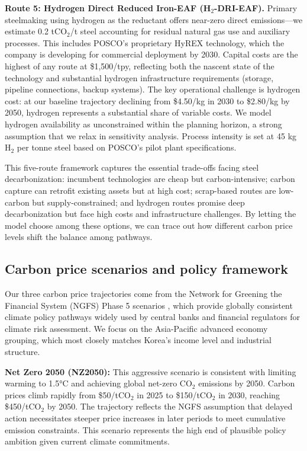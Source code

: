 \documentclass[preprint,1p,authoryear]{elsarticle}
\begin{document}
\textbf{Route 5: Hydrogen Direct Reduced Iron-EAF (H$_2$-DRI-EAF).} Primary steelmaking using hydrogen as the reductant offers near-zero direct emissions—we estimate 0.2 tCO$_2$/t steel accounting for residual natural gas use and auxiliary processes. This includes POSCO's proprietary HyREX technology, which the company is developing for commercial deployment by 2030. Capital costs are the highest of any route at \$1,500/tpy, reflecting both the nascent state of the technology and substantial hydrogen infrastructure requirements (storage, pipeline connections, backup systems). The key operational challenge is hydrogen cost: at our baseline trajectory declining from \$4.50/kg in 2030 to \$2.80/kg by 2050, hydrogen represents a substantial share of variable costs. We model hydrogen availability as unconstrained within the planning horizon, a strong assumption that we relax in sensitivity analysis. Process intensity is set at 45 kg H$_2$ per tonne steel based on POSCO's pilot plant specifications.

This five-route framework captures the essential trade-offs facing steel decarbonization: incumbent technologies are cheap but carbon-intensive; carbon capture can retrofit existing assets but at high cost; scrap-based routes are low-carbon but supply-constrained; and hydrogen routes promise deep decarbonization but face high costs and infrastructure challenges. By letting the model choose among these options, we can trace out how different carbon price levels shift the balance among pathways.

\subsection{Carbon price scenarios and policy framework}

Our three carbon price trajectories come from the Network for Greening the Financial System (NGFS) Phase 5 scenarios \citep{NGFS2024}, which provide globally consistent climate policy pathways widely used by central banks and financial regulators for climate risk assessment. We focus on the Asia-Pacific advanced economy grouping, which most closely matches Korea's income level and industrial structure.

\textbf{Net Zero 2050 (NZ2050):} This aggressive scenario is consistent with limiting warming to 1.5°C and achieving global net-zero CO$_2$ emissions by 2050. Carbon prices climb rapidly from \$50/tCO$_2$ in 2025 to \$150/tCO$_2$ in 2030, reaching \$450/tCO$_2$ by 2050. The trajectory reflects the NGFS assumption that delayed action necessitates steeper price increases in later periods to meet cumulative emission constraints. This scenario represents the high end of plausible policy ambition given current climate commitments.
\end{document}
